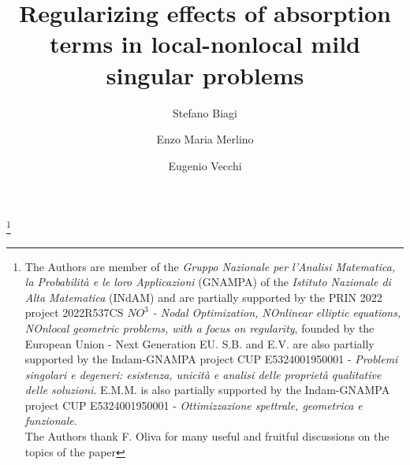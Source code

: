 \documentclass[11pt,a4paper]{amsart}
\theoremstyle{definition}
\theoremstyle{plain}
\numberwithin{equation}{section}
\begin{document}
 \title[Local-nonlocal singular problems with absorption]
 {Regularizing effects of absorption terms in local-nonlocal mild singular problems}

 \author[S.\,Biagi]{Stefano Biagi}
 \author[E.M.\,Merlino]{Enzo Maria Merlino}
 \author[E.\,Vecchi]{Eugenio Vecchi}
 
 \address[S.\,Biagi]{Dipartimento di Matematica
 \newline\indent Politecnico di Milano \newline\indent
 Via Bonardi 9, 20133 Milano, Italy}

 \address[E.M.\,Merlino]{Dipartimento di Matematica
 \newline\indent Università di Bologna \newline\indent
 Piazza di Porta San Donato 5, 40126 Bologna, Italy}
 
 \address[E.\,Vecchi]{Dipartimento di Matematica
 \newline\indent Università di Bologna \newline\indent
 Piazza di Porta San Donato 5, 40126 Bologna, Italy}



\thanks{The Authors are
member of the {\em Gruppo Nazionale per
l'Analisi Ma\-te\-ma\-ti\-ca, la Probabilit\`a e le loro Applicazioni}
(GNAMPA) of the {\em Istituto Nazionale di Alta Matematica} (INdAM) and are
partially 
supported by the PRIN 2022 project 2022R537CS \emph{$NO^3$ - Nodal Optimization, NOnlinear elliptic equations, NOnlocal geometric problems, with a focus on regularity}, founded by the European Union - Next Generation EU.  S.B. and E.V. are also partially supported by the Indam-GNAMPA project CUP E5324001950001 - {\em Problemi singolari e degeneri: esistenza, unicità e analisi delle proprietà qualitative delle soluzioni}. E.M.M. is also partially supported by the Indam-GNAMPA project CUP E5324001950001 - {\em Ottimizzazione spettrale, geometrica e funzionale}. \\
The Authors thank F. Oliva for many useful and fruitful discussions on the topics of the paper}
\end{document}

